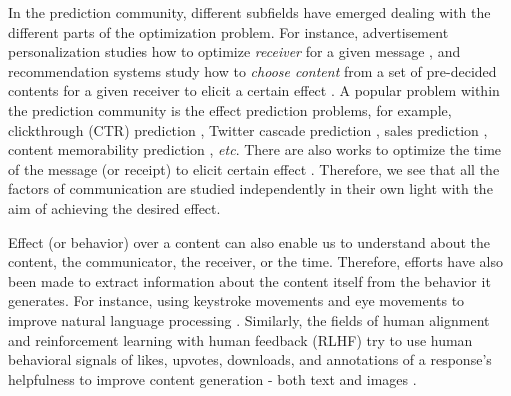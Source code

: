 \documentclass[hidelinks,11pt,a4paper]{report}
\renewcommand{\cite}[1]{\citep{#1}}
\begin{document}
In the prediction community, different subfields have emerged dealing with the different parts of the optimization problem. For instance, advertisement personalization studies how to optimize \textit{receiver} for a given message \cite{XXX}, and recommendation systems study how to \textit{choose content} from a set of pre-decided contents for a given receiver to elicit a certain effect \cite{XXX}. A popular problem within the prediction community is the effect prediction problems, for example, clickthrough (CTR) prediction \cite{XXX}, Twitter cascade prediction \cite{cheng2014can,martin2016exploring}, sales prediction \cite{choi2012predicting,pryzant2017predicting}, content memorability prediction \cite{isola2011makes,khosla2015understanding,si2023long}, \textit{etc}. There are also works to optimize the time of the message (or receipt) to elicit certain effect \cite{XXX}. Therefore, we see that all the factors of communication are studied independently in their own light with the aim of achieving the desired effect. 


Effect (or behavior) over a content can also enable us to understand about the content, the communicator, the receiver, or the time. Therefore, efforts have also been made to extract information about the content itself from the behavior it generates. For instance, using keystroke movements \cite{plank2016keystroke} and eye movements to improve natural language processing \cite{klerke2016improving,khurana-etal-2023-synthesizing}. Similarly, the fields of human alignment and reinforcement learning with human feedback (RLHF) try to use human behavioral signals of likes, upvotes, downloads, and annotations of a response's helpfulness to improve content generation - both text \cite{kreutzer2018can,stiennon2020learning,ziegler2019fine,nakano2021webgpt,si2023long} and images \cite{lee2023aligning,pressman2023simulacra,wu2023better,khurana2023behavior}.
\end{document}
